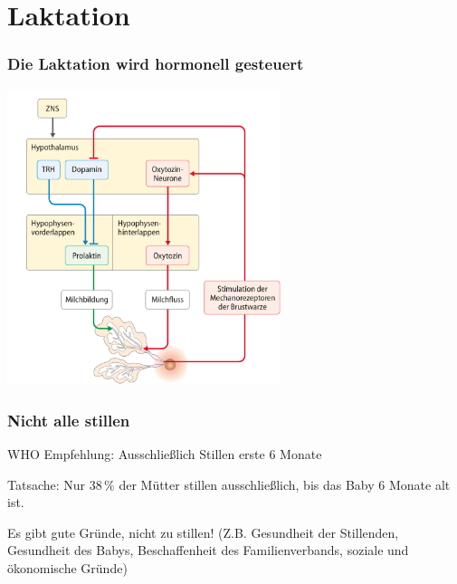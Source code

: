 \documentclass{beamer}
\begin{document}
\section{Laktation}

\begin{frame}
\frametitle{Die Laktation wird hormonell gesteuert}

\begin{center}
    \includegraphics[width=0.6\textwidth]{hormone_laktation.png}
\end{center}

\end{frame}



\begin{frame}
\frametitle{Nicht alle stillen}


WHO Empfehlung: Ausschließlich Stillen erste 6 Monate \\[0.5 cm]

\pause

Tatsache: Nur \(38\,\%\) der Mütter stillen ausschließlich, bis das Baby 6 Monate alt ist.  \\[0.5 cm]

\pause

Es gibt gute  Gründe, nicht zu stillen! (Z.B. Gesundheit der Stillenden, Gesundheit des Babys, Beschaffenheit des Familienverbands, soziale und ökonomische Gründe)



\end{frame}
\end{document}
